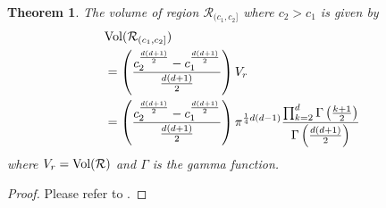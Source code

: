 \documentclass[Afour,sageh,times]{sagej}
\newtheorem{theorem}{\bf Theorem}
\begin{document}
\begin{theorem}
  \normalfont \cite{mittelbach2012sampling} The volume of region $\mathcal{R}_{(c_1,c_2]}$ where $c_2>c_1$ is given by
   \begin{align}
   \label{eq:vol_Rc}
       &\textup{Vol}(\mathcal{R}_{(c_1,c_2]})\nonumber\\
       &=\left(\frac{c_2^{\frac{d(d+1)}{2}}-c_1^{\frac{d(d+1)}{2}}}{\frac{d(d+1)}{2}}\right)V_r\nonumber\\
       &=\left(\frac{c_2^{\frac{d(d+1)}{2}}-c_1^{\frac{d(d+1)}{2}}}{\frac{d(d+1)}{2}}\right)\pi^{\frac{1}{4} d(d-1)} \frac{\prod_{k=2}^d \Gamma\left(\frac{k+1}{2}\right)}{\Gamma\left(\frac{d(d+1)}{2}\right)}
   \end{align}
   where $V_r=\textup{Vol}(\mathcal{R})$ and $\Gamma$ is the gamma function.
\end{theorem}
\begin{proof}
    Please refer to \cite{mittelbach2012sampling}.
\end{proof}
\end{document}
